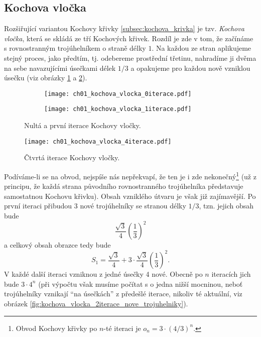 \subsection{Kochova vločka}\label{subsec:kochova_vlocka}
Rozšiřující variantou Kochovy křivky \ref{subsec:kochova_krivka} je tzv. \emph{Kochova vločka}, která se skládá ze tří Kochových křivek. Rozdíl je zde v tom, že začínáme s rovnostranným trojúhelníkem o straně délky $1$. Na každou ze stran aplikujeme stejný proces, jako předtím, tj. odebereme prostřední třetinu, nahradíme ji dvěma na sebe navazujícími úsečkami délek $1/3$ a opakujeme pro každou nově vzniklou úsečku (viz obrázky \ref{fig:kochova_vlocka_dve_iterace} a \ref{fig:kochova_krivka_5iterace}).
\begin{figure}[h]
    \centering
    \begin{subfigure}{\subfigwidth}
        \centering
        \texttt{[image: ch01\_kochova\_vlocka\_0iterace.pdf]}
    \end{subfigure}
    \qquad
    \begin{subfigure}{\subfigwidth}
        \centering
        \texttt{[image: ch01\_kochova\_vlocka\_1iterace.pdf]}
    \end{subfigure}
    \caption{Nultá a první iterace Kochovy vločky.}
    \label{fig:kochova_vlocka_dve_iterace}
\end{figure}
\begin{figure}[h]
    \centering
    \texttt{[image: ch01\_kochova\_vlocka\_4iterace.pdf]}
    \caption{Čtvrtá iterace Kochovy vločky.}
    \label{fig:kochova_krivka_5iterace}
\end{figure}
Podíváme-li se na obvod, nejspíše nás nepřekvapí, že ten je i zde nekonečný\footnote{Obvod Kochovy křivky po $n$-té iteraci je $o_n=3\cdot(4/3)^{n}$.} (už z principu, že každá strana původního rovnostranného trojúhelníka představuje samostatnou Kochovu křivku). Obsah vzniklého útvaru je však již zajímavější. Po první iteraci přibudou 3 nové trojúhelníky se stranou délky $1/3$, tzn. jejich obsah bude
\begin{equation*}
    \dfrac{\sqrt{3}}{4}\left(\dfrac{1}{3}\right)^2
\end{equation*}
a celkový obsah obrazce tedy bude
\begin{equation*}
    S_1=\dfrac{\sqrt{3}}{4}+3\cdot\dfrac{\sqrt{3}}{4}\left(\dfrac{1}{3}\right)^2.
\end{equation*}
V každé další iteraci vzniknou z jedné úsečky 4 nové. Obecně po $n$ iteracích jich bude $3\cdot 4^n$ (při výpočtu však musíme počítat s o jedna nižší mocninou, neboť trojúhelníky vznikají ``na úsečkách'' z předešlé iterace, nikoliv té aktuální, viz obrázek \ref{fig:kochova_vlocka_2iterace_nove_trojuhelniky}).

